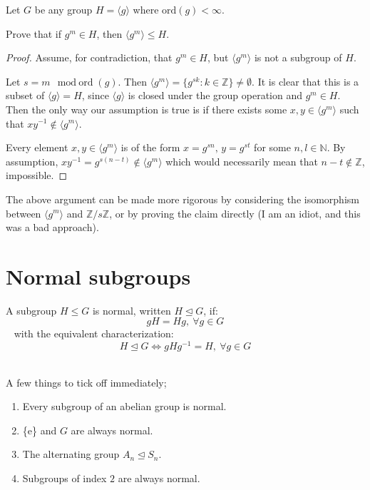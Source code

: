 \begin{prob}
    Let $G$ be any group $H = \langle g \rangle$ where $\text{ord}(g) < \infty$. 

    Prove that if $g^m \in H$, then $\langle g^m \rangle \leq H$. 
\end{prob}
\begin{proof}
    Assume, for contradiction, that $g^m \in H$, but $\langle g^m \rangle$ 
    is not a subgroup of $H$. 

    Let $s = m \mod \text{ord}(g)$. 
    Then $\langle g^m \rangle = \{g^{sk} : k \in \mathbb Z\} \neq \emptyset$.  
    It is clear that this is a subset of $\langle g \rangle = H$, since 
    $\langle g \rangle$ is closed under the group operation and 
    $g^m \in H$. 
    Then the only way our assumption is true is if 
    there exists some $x,y \in \langle g^m \rangle$ such that 
    $xy^{-1} \not\in \langle g^m \rangle$. 

    Every element $x,y \in \langle g^m \rangle$ is of the form 
    $x = g^{sn}, \, y = g^{st}$ for some $n,l \in \mathbb N$. 
    By assumption, 
    $xy^{-1} = g^{s(n-t)} \not\in \langle g^m \rangle$ 
    which would necessarily mean that $n-t \not \in \mathbb Z$, 
    impossible. 
\end{proof}
The above argument can be made more rigorous 
by considering the isomorphism between $\langle g^m \rangle$ and 
$\mathbb Z/s\mathbb Z$, or by proving the claim 
directly (I am an idiot, and this was a bad approach). 

\newpage 
\section{Normal subgroups}
\begin{defn}
    \label{defn:normal_subgroup}
    A subgroup $H \leq G$ is normal, written $H \trianglelefteq G$, if:
    $$ 
        gH = Hg, \: \forall g \in G
    $$ 
    with the equivalent characterization:
    $$ 
        H \trianglelefteq G \Leftrightarrow gHg^{-1} = H, \: \forall g \in G
    $$ 
\end{defn}

A few things to tick off immediately; 
\begin{enumerate}
    \item Every subgroup of an abelian group is normal. 
    \item \{e\} and $G$ are always normal. 
    \item The alternating group $A_n \trianglelefteq S_n$. 
    \item Subgroups of index $2$ are always normal. 
\end{enumerate}

